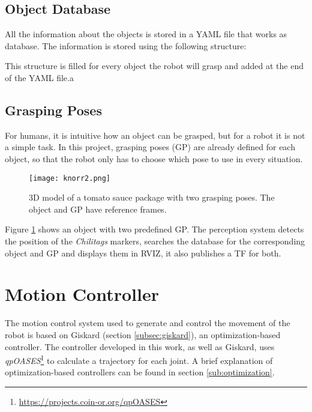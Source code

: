 \subsection{Object Database}
\label{sec:db}
All the information about the objects is stored in a YAML file that works as database. The information is stored using the following structure:



This structure is filled for every object the robot will grasp and added at the end of the YAML file.a

\subsection{Grasping Poses}

For humans, it is intuitive how an object can be grasped, but for a robot it is not a simple task. In this project, grasping poses (GP) are already defined for each object, so that the robot only has to choose which pose to use in every situation.
\begin{figure}[H]
	\centering
		{\texttt{[image: knorr2.png]}}
	\vspace{-12pt}
	\caption[Grasping poses]{3D model of a tomato sauce package with two grasping poses. The object and GP have reference frames.}
	\vspace{-10pt}
	\label{fig:knorr}
\end{figure}

Figure \ref{fig:knorr} shows an object with two predefined GP. The perception system detects the position of the \textit{Chilitags} markers, searches the database for the corresponding object and GP and displays them in RVIZ, it also publishes a TF for both.


\section{Motion Controller}
\label{sec:motion_controller}

The motion control system used  to generate and control the movement of the robot is based on Giskard (section \ref{subsec:giskard}), an optimization-based controller. The controller developed in this work, as well as Giskard, uses \textit{qpOASES}\footnote{\url{https://projects.coin-or.org/qpOASES}}  to calculate a trajectory for each joint. A brief explanation of optimization-based controllers can be found in section \ref{sub:optimization}.

